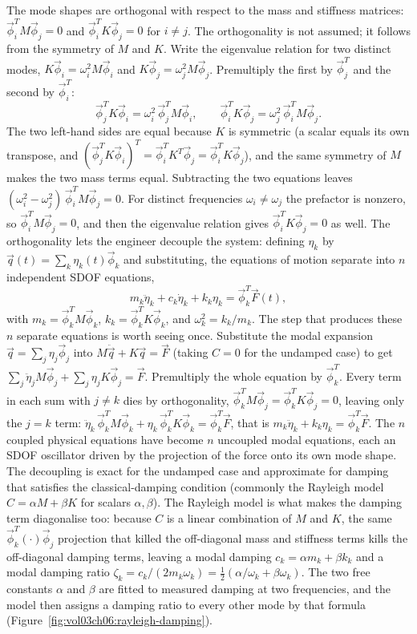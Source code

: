 The mode shapes are orthogonal with respect to the mass and
stiffness matrices: $\vec{\phi}_i^T M \vec{\phi}_j = 0$ and
$\vec{\phi}_i^T K \vec{\phi}_j = 0$ for $i \neq j$. The orthogonality is
not assumed; it follows from the symmetry of $M$ and $K$. Write the
eigenvalue relation for two distinct modes, $K\vec{\phi}_i =
\omega_i^2 M\vec{\phi}_i$ and $K\vec{\phi}_j = \omega_j^2 M\vec{\phi}_j$.
Premultiply the first by $\vec{\phi}_j^T$ and the second by
$\vec{\phi}_i^T$:
\[
\vec{\phi}_j^T K\vec{\phi}_i = \omega_i^2\,\vec{\phi}_j^T M\vec{\phi}_i,
\qquad
\vec{\phi}_i^T K\vec{\phi}_j = \omega_j^2\,\vec{\phi}_i^T M\vec{\phi}_j.
\]
The two left-hand sides are equal because $K$ is symmetric (a scalar
equals its own transpose, and $(\vec{\phi}_j^T K\vec{\phi}_i)^T =
\vec{\phi}_i^T K^T\vec{\phi}_j = \vec{\phi}_i^T K\vec{\phi}_j$), and the
same symmetry of $M$ makes the two mass terms equal. Subtracting the two
equations leaves $(\omega_i^2 - \omega_j^2)\,\vec{\phi}_i^T M\vec{\phi}_j
= 0$. For distinct frequencies $\omega_i \neq \omega_j$ the prefactor is
nonzero, so $\vec{\phi}_i^T M\vec{\phi}_j = 0$, and then the eigenvalue
relation gives $\vec{\phi}_i^T K\vec{\phi}_j = 0$ as well. The
orthogonality
lets the engineer decouple the system: defining  $\eta_k$ by $\vec{q}(t) = \sum_k \eta_k(t) \vec{\phi}_k$
and substituting, the equations of motion separate into $n$
independent SDOF equations,
\[
m_k \ddot{\eta}_k + c_k \dot{\eta}_k + k_k \eta_k = \vec{\phi}_k^T
\vec{F}(t),
\]
with $m_k = \vec{\phi}_k^T M \vec{\phi}_k$, $k_k = \vec{\phi}_k^T K
\vec{\phi}_k$, and $\omega_k^2 = k_k/m_k$. The step that produces these
$n$ separate equations is worth seeing once. Substitute the modal
expansion $\vec{q} = \sum_j \eta_j\vec{\phi}_j$ into $M\ddot{\vec{q}} +
K\vec{q} = \vec{F}$ (taking $C = 0$ for the undamped case) to get
$\sum_j \ddot{\eta}_j M\vec{\phi}_j + \sum_j \eta_j K\vec{\phi}_j =
\vec{F}$. Premultiply the whole equation by $\vec{\phi}_k^T$. Every term
in each sum with $j \neq k$ dies by orthogonality, $\vec{\phi}_k^T
M\vec{\phi}_j = \vec{\phi}_k^T K\vec{\phi}_j = 0$, leaving only the
$j = k$ term: $\ddot{\eta}_k\,\vec{\phi}_k^T M\vec{\phi}_k +
\eta_k\,\vec{\phi}_k^T K\vec{\phi}_k = \vec{\phi}_k^T\vec{F}$, that is
$m_k\ddot{\eta}_k + k_k\eta_k = \vec{\phi}_k^T\vec{F}$. The $n$ coupled
physical equations have become $n$ uncoupled modal equations, each an
SDOF oscillator driven by the projection of the force onto its own mode
shape. The decoupling is exact for
the undamped case and approximate for damping that satisfies the
classical-damping condition (commonly the Rayleigh model $C = \alpha
M + \beta K$ for scalars $\alpha, \beta$). The Rayleigh model is what
makes the damping term diagonalise too: because $C$ is a linear
combination of $M$ and $K$, the same $\vec{\phi}_k^T(\cdot)\vec{\phi}_j$
projection that killed the off-diagonal mass and stiffness terms kills
the off-diagonal damping terms, leaving a modal damping $c_k =
\alpha m_k + \beta k_k$ and a modal damping ratio $\zeta_k = c_k/(2 m_k
\omega_k) = \tfrac12(\alpha/\omega_k + \beta\omega_k)$. The
two free constants $\alpha$ and $\beta$ are fitted to measured damping
at two frequencies, and the model then assigns a damping ratio to every
other mode by that formula
(Figure~\ref{fig:vol03ch06:rayleigh-damping}).


